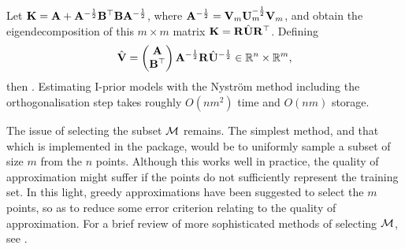  Let ${\mathbf K} = {\mathbf A} + {\mathbf A}^{-\frac{1}{2}}{\mathbf B}^\top{\mathbf B}{\mathbf A}^{-\frac{1}{2}}$, where ${\mathbf A}^{-\frac{1}{2}} = {\mathbf V}_m{\mathbf U}_m^{-\frac{1}{2}}{\mathbf V}_m$, and obtain the eigendecomposition of this $m\times m$ matrix ${\mathbf K} = {\mathbf R}\hat{{\mathbf U}}{\mathbf R}^\top$.
 Defining
 \[
   \hat{{\mathbf V}} = 
   \begin{pmatrix}
     {\mathbf A} \\
     {\mathbf B}^\top
   \end{pmatrix}
   {\mathbf A}^{-\frac{1}{2}}{\mathbf R}\hat{{\mathbf U}}^{-\frac{1}{2}} \in \mathbb{R}^n \times \mathbb{R}^m,
 \]
 then 
 .
 Estimating I-prior models with the Nystr\"om method including the orthogonalisation step takes roughly $O(nm^2)$ time and $O(nm)$ storage.
 
The issue of selecting the subset ${\mathcal M}$ remains.
The simplest method, and that which is implemented in the  package, 
would be to uniformly sample a subset of size $m$ from the $n$ points.
Although this works well in practice, the quality of approximation might suffer if the points do not sufficiently represent the training set.
In this light, greedy approximations have been suggested to select the $m$ points, so as to reduce some error criterion relating to the quality of approximation.
For a brief review of more sophisticated methods of selecting ${\mathcal M}$, see \citet[§8.1, pp. 173--174]{rasmussen2006gaussian}.


